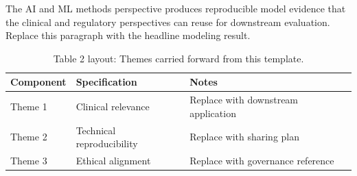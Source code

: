 
The AI and ML methods perspective produces reproducible model evidence that the clinical and regulatory perspectives can reuse for downstream evaluation. Replace this paragraph with the headline modeling result.

\begin{table}[H]
\caption{Table 2 layout: Themes carried forward from this template.}
\label{tab:conclusions_themes}
\centering
\begin{tabular}{>{\raggedright\arraybackslash}p{3.4cm} >{\raggedright\arraybackslash}p{4.6cm} >{\raggedright\arraybackslash}p{5.4cm}}
\toprule
\textbf{Component} & \textbf{Specification} & \textbf{Notes} \\
\midrule
  Theme 1 & Clinical relevance & Replace with downstream application \\
  Theme 2 & Technical reproducibility & Replace with sharing plan \\
  Theme 3 & Ethical alignment & Replace with governance reference \\
\bottomrule
\end{tabular}
\end{table}
